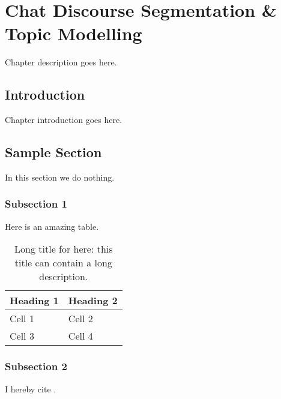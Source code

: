 
\chapter{Chat Discourse Segmentation \& Topic Modelling} %
\label{ch:TM}

\begin{textsl}
{\small Chapter description goes here.}
\end{textsl}

\vspace*{1cm}




\section{Introduction}
Chapter introduction goes here.

\section{Sample Section}
In this section we do nothing.
\subsection{Subsection 1}
Here is an amazing table.
\begin{table}
 \centering
 \begin{tabular}{ | l l | }
 \hline
  \textbf{Heading 1} & \textbf{Heading 2} \\ \hline
   Cell 1 & Cell 2 \\
   Cell 3 & Cell 4 \\ \hline
 \end{tabular}
 \caption [Short title for list of tables]{Long title for here: this title can contain a long description.}
 \label{tbl:dt_chi2}
\end{table}
\subsection{Subsection 2}
I hereby cite \cite{ref1}.

